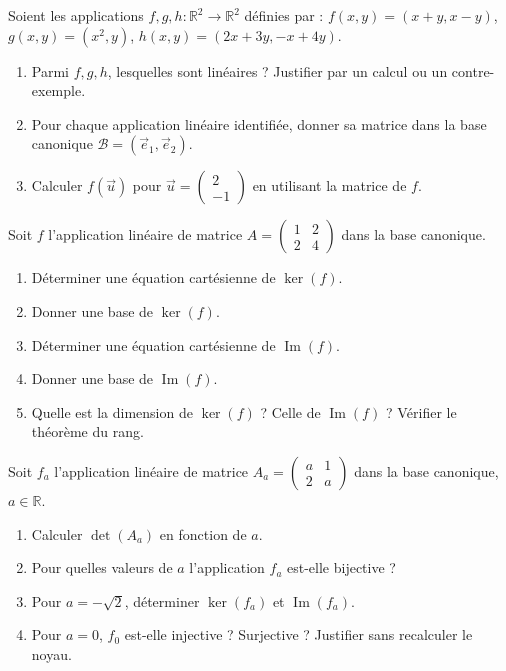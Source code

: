 \documentclass[11pt]{article}
\begin{document}
\begin{exercice}
Soient les applications $f, g, h : \mathbb{R}^2 \to \mathbb{R}^2$ définies par :
$f(x,y) = (x+y, x-y)$, \quad $g(x,y) = (x^2, y)$, \quad $h(x,y) = (2x+3y, -x+4y)$.
\begin{enumerate}
    \item Parmi $f, g, h$, lesquelles sont linéaires ? Justifier par un calcul ou un contre-exemple.
    \item Pour chaque application linéaire identifiée, donner sa matrice dans la base canonique $\mathcal{B} = (\vec{e}_1, \vec{e}_2)$.
    \item Calculer $f(\vec{u})$ pour $\vec{u} = \begin{pmatrix} 2 \\ -1 \end{pmatrix}$ en utilisant la matrice de $f$.
\end{enumerate}
\end{exercice}

\begin{exercice}
Soit $f$ l'application linéaire de matrice $A = \begin{pmatrix} 1 & 2 \\ 2 & 4 \end{pmatrix}$ dans la base canonique.
\begin{enumerate}
    \item Déterminer une équation cartésienne de $\ker(f)$.
    \item Donner une base de $\ker(f)$.
    \item Déterminer une équation cartésienne de $\operatorname{Im}(f)$.
    \item Donner une base de $\operatorname{Im}(f)$.
    \item Quelle est la dimension de $\ker(f)$ ? Celle de $\operatorname{Im}(f)$ ? Vérifier le théorème du rang.
\end{enumerate}
\end{exercice}

\begin{exercice}
Soit $f_a$ l'application linéaire de matrice $A_a = \begin{pmatrix} a & 1 \\ 2 & a \end{pmatrix}$ dans la base canonique, $a \in \mathbb{R}$.
\begin{enumerate}
    \item Calculer $\det(A_a)$ en fonction de $a$.
    \item Pour quelles valeurs de $a$ l'application $f_a$ est-elle bijective ?
    \item Pour $a = -\sqrt{2}$, déterminer $\ker(f_a)$ et $\operatorname{Im}(f_a)$.
    \item Pour $a = 0$, $f_0$ est-elle injective ? Surjective ? Justifier sans recalculer le noyau.
\end{enumerate}
\end{exercice}
\end{document}
